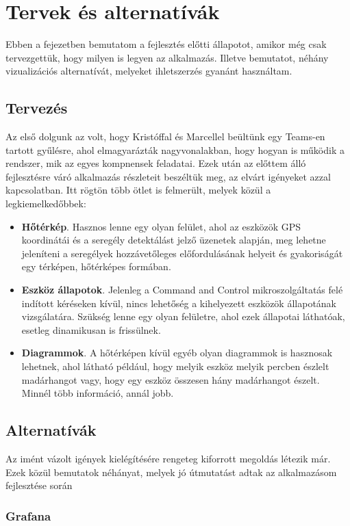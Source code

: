 \chapter{Tervek és alternatívák}
\label{chapt:birdmap-introduction}
Ebben a fejezetben bemutatom a fejlesztés előtti állapotot, amikor még csak tervezgettük, hogy milyen is legyen az alkalmazás.
Illetve bemutatot, néhány vizualizációs alternatívát, melyeket ihletszerzés gyanánt használtam.

\section{Tervezés}
Az első dolgunk az volt, hogy Kristóffal és Marcellel beültünk egy Teams\footnotemark-en tartott gyűlésre,
ahol elmagyarázták nagyvonalakban, hogy hogyan is működik a rendszer, mik az egyes kompnensek feladatai. 
Ezek után az előttem álló fejlesztésre váró alkalmazás részleteit beszéltük meg, az elvárt igényeket azzal kapcsolatban.
Itt rögtön több ötlet is felmerült, melyek közül a legkiemelkedőbbek:
\begin{itemize}
    \item \textbf{Hőtérkép}. Hasznos lenne egy olyan felület, ahol az eszközök GPS koordinátái és a seregély detektálást jelző üzenetek alapján, meg lehetne jeleníteni a seregélyek hozzávetőleges előfordulásának helyeit és gyakoriságát egy térképen, hőtérképes formában.
    \item \textbf{Eszköz állapotok}. Jelenleg a Command and Control mikroszolgáltatás felé indított kéréseken kívül, nincs lehetőség a kihelyezett eszközök állapotának vizsgálatára. Szükség lenne egy olyan felületre, ahol ezek állapotai láthatóak, esetleg dinamikusan is frissülnek.
    \item \textbf{Diagrammok}. A hőtérképen kívül egyéb olyan diagrammok is hasznosak lehetnek, ahol látható például, hogy melyik eszköz melyik percben észlelt madárhangot vagy, hogy egy eszköz összesen hány madárhangot észelt. Minnél több információ, annál jobb.
\end{itemize}

\section{Alternatívák}
Az imént vázolt igények kielégítésére rengeteg kiforrott megoldás létezik már. Ezek közül bemutatok néhányat, melyek jó útmutatást adtak az alkalmazásom fejlesztése során

\subsection{Grafana}
